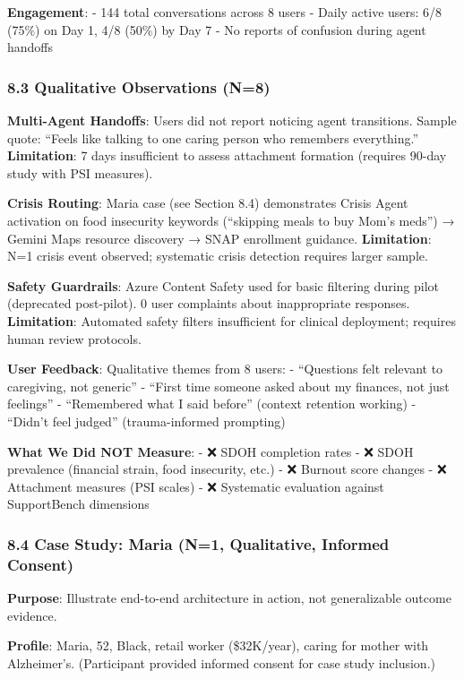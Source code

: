 \documentclass[
]{article}
\begin{document}
\textbf{Engagement}: - 144 total conversations across 8 users - Daily
active users: 6/8 (75\%) on Day 1, 4/8 (50\%) by Day 7 - No reports of
confusion during agent handoffs

\subsubsection{8.3 Qualitative Observations
(N=8)}\label{qualitative-observations-n8}

\textbf{Multi-Agent Handoffs}: Users did not report noticing agent
transitions. Sample quote: ``Feels like talking to one caring person who
remembers everything.'' \textbf{Limitation}: 7 days insufficient to
assess attachment formation (requires 90-day study with PSI measures).

\textbf{Crisis Routing}: Maria case (see Section 8.4) demonstrates
Crisis Agent activation on food insecurity keywords (``skipping meals to
buy Mom's meds'') → Gemini Maps resource discovery → SNAP enrollment
guidance. \textbf{Limitation}: N=1 crisis event observed; systematic
crisis detection requires larger sample.

\textbf{Safety Guardrails}: Azure Content Safety used for basic
filtering during pilot (deprecated post-pilot). 0 user complaints about
inappropriate responses. \textbf{Limitation}: Automated safety filters
insufficient for clinical deployment; requires human review protocols.

\textbf{User Feedback}: Qualitative themes from 8 users: - ``Questions
felt relevant to caregiving, not generic'' - ``First time someone asked
about my finances, not just feelings'' - ``Remembered what I said
before'' (context retention working) - ``Didn't feel judged''
(trauma-informed prompting)

\textbf{What We Did NOT Measure}: - ❌ SDOH completion rates - ❌ SDOH
prevalence (financial strain, food insecurity, etc.) - ❌ Burnout score
changes - ❌ Attachment measures (PSI scales) - ❌ Systematic evaluation
against SupportBench dimensions

\subsubsection{8.4 Case Study: Maria (N=1, Qualitative, Informed
Consent)}\label{case-study-maria-n1-qualitative-informed-consent}

\textbf{Purpose}: Illustrate end-to-end architecture in action, not
generalizable outcome evidence.

\textbf{Profile}: Maria, 52, Black, retail worker (\$32K/year), caring
for mother with Alzheimer's. (Participant provided informed consent for
case study inclusion.)
\end{document}
